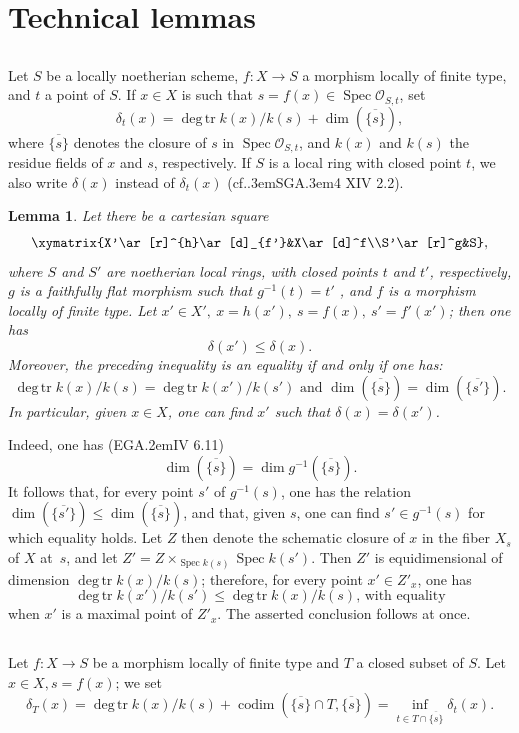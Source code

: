\documentclass[11pt,a4paper,oneside]{book}
\providecommand{\pageoriginale}{%
  \refstepcounter{pageoriginal}%
  \marginpar{\raggedright\footnotesize\bfseries\thepageoriginal}%
  \xspace}
\providecommand{\cf}{cf.\kern.3em}
\providecommand{\EGA}{\textup{EGA}\kern.2em}
\providecommand{\SGA}{\textup{SGA}\kern.3em}
\providecommand{\Oo}{\mathcal O}
\DeclareMathOperator{\degtr}{deg\,tr}
\providecommand{\Spec}{\operatorname{Spec}}
\providecommand{\codim}{\operatorname{codim}}
\theoremstyle{plain}
\newtheorem{sublemme}[subsubsection]{Lemma}
\theoremstyle{definition}
\theoremstyle{remark}
\begin{document}
\section{Technical lemmas} \label{XIV.2}

\subsection{\texorpdfstring{}{XIV.2.1}} \label{XIV.2.1}
Let $S$ be a locally noetherian scheme, $f:X\to S$ a morphism locally of finite type, and $t$ a point of $S$. If $x\in X$ is such that $s=f(x)\in\Spec\Oo_{S, t}$, set
$$
\delta_t(x)=\degtr k(x)/k(s)+\dim(\overline{\{s\}}),
$$
where $\overline{\{s\}}$ denotes the closure of $s$ in $\Spec\Oo_{S, t}$, and $k(x)$ and $k(s)$ the residue fields of $x$ and $s$, respectively. If $S$ is a local ring with closed point $t$, we also write $\delta(x)$ instead of $\delta_t(x)$ (\cf \SGA 4 XIV 2.2).
\begin{sublemme} \label{XIV.2.1.1} Let there be a cartesian square
$$
\xymatrix{X'\ar[r]^{h}\ar[d]_{f'}&X\ar[d]^f\\S'\ar[r]^g&S},
$$
where $S$ and $S'$ are noetherian local rings, with closed points $t$ and $t'$, respectively, $g$ is a faithfully flat morphism such that $g^{-1}(t)=t'$\pageoriginale, and $f$ is a morphism locally of finite type. Let $x'\in X',\ x=h(x'),\ s=f(x),\ s'=f'(x')$; then one has
$$
\delta(x')\leq\delta(x).
$$
Moreover, the preceding inequality is an equality if and only if one has:
$$
\degtr k(x)/k(s)=\degtr k(x')/k(s')\text{ and }\dim(\overline{\{s\}})=\dim(\overline{\{s'\}}).
$$
In particular, given $x\in X$, one can find $x'$ such that $\delta(x)=\delta(x')$.
\end{sublemme}

Indeed, one has (\EGA IV 6.11)
$$
\dim(\overline{\{s\}})=\dim g^{-1}(\overline{\{s\}}).
$$
It follows that, for every point $s'$ of $g^{-1}(s)$, one has the relation $\dim(\overline{\{s'\}})\leq \dim(\overline{\{s\}})$, and that, given $s$, one can find $s'\in g^{-1}(s)$ for which equality holds. Let $Z$ then denote the schematic closure of $x$ in the fiber $X_s$ of $X$ at~$s$, and let $Z'=Z\times_{\Spec k(s)}\Spec k(s')$. Then $Z'$ is equidimensional of dimension $\degtr k(x)/k(s)$; therefore, for every point $x'\in Z'_{x}$, one has
$$
\degtr k(x')/k(s')\leq\degtr k(x)/k(s)\text{, with equality}$$
when $x'$ is a maximal point of $Z'_x$. The asserted conclusion follows at once.

\subsection{\texorpdfstring{}{XIV.2.2}} \label{XIV.2.2} Let $f:X\to S$ be a morphism locally of finite type and $T$ a closed subset of $S$. Let $x\in X, s=f(x)$; we set
$$
\delta_T(x)=\degtr k(x)/k(s)+\codim(\overline{\{s\}}\cap T, \overline{\{s\}})=\inf_{t\in T\cap\overline{\{s\}}}\delta_t(x).
$$
\end{document}
